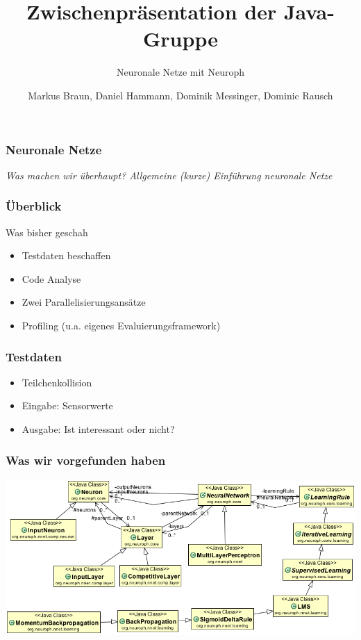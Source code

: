 \documentclass[18pt]{beamer}
\title{Zwischenpräsentation der Java-Gruppe}
\subtitle{Neuronale Netze mit Neuroph}
\author{Markus Braun, Daniel Hammann, Dominik Messinger, Dominic Rausch}
\institute{Institut für Programmstrukturen und Datenorganisation (IPD), Lehrstuhl für Programmiersysteme}
\begin{document}
	\maketitle

	\begin{frame}[c]\frametitle{Neuronale Netze}
		\begin{center}
		\textit{Was machen wir überhaupt? Allgemeine (kurze) Einführung neuronale Netze}
		\end{center}
	\end{frame}

	\begin{frame}[c]\frametitle{Überblick}
		\begin{block}{Was bisher geschah}
		    \begin{itemize}
			    \item Testdaten beschaffen
		    	\item Code Analyse
		    	\item Zwei Parallelisierungsansätze
		    	\item Profiling (u.a. eigenes Evaluierungsframework)
		    \end{itemize}		    
		\end{block}
	\end{frame}
	
	\begin{frame}[c]\frametitle{Testdaten}
		\begin{itemize}
				\item Teilchenkollision
				\item Eingabe: Sensorwerte
				\item Ausgabe: Ist interessant oder nicht?
		\end{itemize}		
	\end{frame}

	\begin{frame}[c]\frametitle{Was wir vorgefunden haben}		
		\includegraphics[scale=0.4]{Klassendiagramm.png}
	\end{frame}
\end{document}
